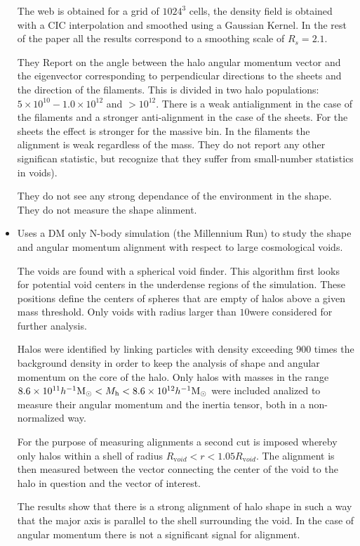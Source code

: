 \documentclass[usenatbib]{mn2e}
\newcommand{\hMpc}{{\ifmmode{h^{-1}{\rm Mpc}}\else{$h^{-1}$Mpc }\fi}}
\newcommand{\hMsun}{{\ifmmode{h^{-1}{\rm
        {M_{\odot}}}}\else{$h^{-1}{\rm{M_{\odot}}}$}\fi}}
\begin{document}
\begin{itemize}
The web is obtained for a grid of $1024^3$ cells, the density field is
obtained with a CIC interpolation and smoothed using a Gaussian
Kernel. In the rest of the paper all the results correspond to a
smoothing scale of $R_{s}=2.1$\hMpc.


They Report on the angle between the halo
angular momentum vector and the eigenvector corresponding to
perpendicular directions to the sheets and the direction of the
filaments. This is divided in two halo populations: $5\times 10^{10} -
1.0\times 10^{12}$ and $>10^{12}$. There is a weak antialignment in
the case of the filaments and a stronger anti-alignment in the case of
the sheets. For the sheets the effect is stronger for the massive
bin. In the filaments the alignment is weak regardless of the
mass. They do not report any other significan statistic, but recognize
that they suffer from small-number statistics in voids).


They do not see any strong dependance of the environment in the
shape. They do not measure the shape alinment.

\item
\citep{Brunino2007}
Uses a DM only N-body simulation (the Millennium Run) to study the
shape and angular momentum alignment with respect to large
cosmological voids. 

The voids are found with a spherical void finder. This algorithm first
looks for potential void centers in the underdense regions of the
simulation. These positions define the centers of spheres that are
empty of halos above a given mass threshold. Only voids with radius
larger than $10$\hMpc were considered for further analysis.

Halos were identified by linking particles with density exceeding 900
times the background density in order to keep the analysis of shape
and angular momentum on the core of the halo. Only halos with masses
in the range $8.6\times 10^{11}\hMsun < M_{\mathrm h}< 8.6\times
10^{12}\hMsun$ were included analized to measure their angular
momentum and the inertia tensor, both in a non-normalized way.

For the purpose of measuring alignments a second cut is imposed
whereby only halos within a shell of radius $R_{\mathrm void}<r<1.05R_{\mathrm
void}$. The alignment is then measured between the vector connecting
the center of the void to the halo in question and the vector of
interest.

The results show that there is a strong alignment of halo shape in
such a way that the major axis is parallel to the shell surrounding
the void. In the case of angular momentum there is not a significant
signal for alignment.





\end{itemize}
\end{document}
